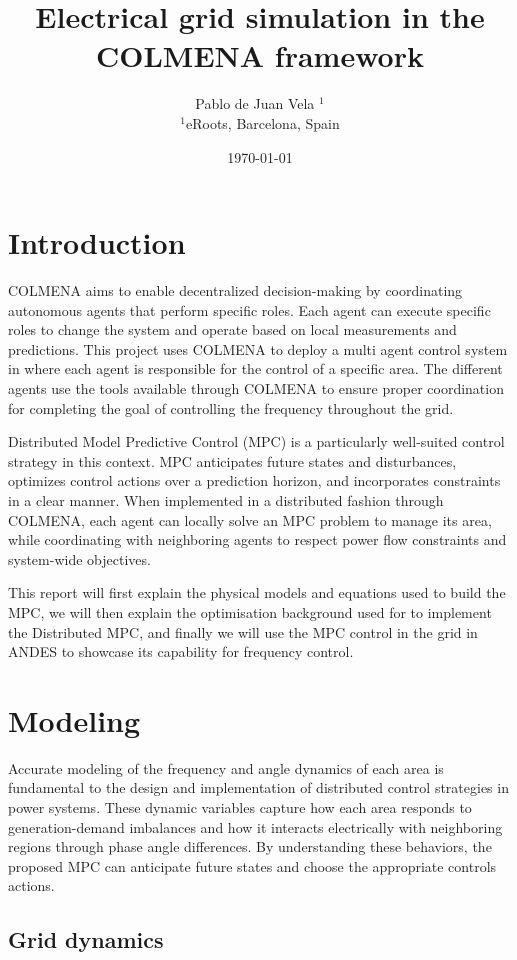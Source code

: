 \documentclass{article}
\title{Electrical grid simulation in the COLMENA framework}
\author{Pablo de Juan Vela $^{1}$ \\
        \small $^{1}$eRoots, Barcelona, Spain \\
}
\date{\today}
\begin{document}
\maketitle
\section{Introduction}

COLMENA aims to enable decentralized decision-making by coordinating autonomous agents that perform specific roles. Each agent can execute specific roles to change the system and operate based on local measurements and predictions. This project uses COLMENA to deploy a multi agent control system in where each agent is responsible for the control of a specific area. The different agents use the tools available through COLMENA to ensure proper coordination for completing the goal of controlling the frequency throughout the grid.

Distributed Model Predictive Control (MPC) is a particularly well-suited control strategy in this context. MPC anticipates future states and disturbances, optimizes control actions over a prediction horizon, and incorporates constraints in a clear manner. When implemented in a distributed fashion through COLMENA, each agent can locally solve an MPC problem to manage its area, while coordinating with neighboring agents to respect power flow constraints and system-wide objectives.

This report will first explain the physical models and equations used to build the MPC, we will then explain the optimisation background used for to implement the Distributed MPC, and finally we will use the MPC control in the grid \cite{grid:ieee39} in ANDES to showcase its capability for frequency control.

\section{Modeling}

Accurate modeling of the frequency and angle dynamics of each area is fundamental to the design and implementation of distributed control strategies in power systems. These dynamic variables capture how each area responds to generation-demand imbalances and how it interacts electrically with neighboring regions through phase angle differences. By understanding these behaviors, the proposed MPC can anticipate future states and choose the appropriate controls actions.

\subsection*{Grid dynamics}
\end{document}
